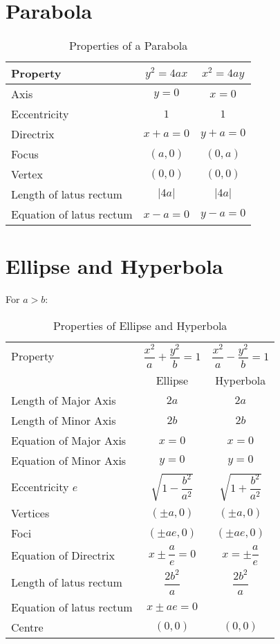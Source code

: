 \documentclass[openany, oneside]{book}
\begin{document}
\section{Parabola}
\begin{table}[H]
\caption{Properties of a Parabola}
\label{parabola}
\begin{center}
\begin{tabular}{l|c|c}
Property&$y^2=4ax$&$x^2=4ay$\\
\hline
Axis&$y=0$&$x=0$\\
Eccentricity&$1$&$1$\\
Directrix&$x+a=0$&$y+a=0$\\
Focus&$(a,0)$&$(0,a)$\\
Vertex&$(0,0)$&$(0,0)$\\
Length of latus rectum&$\lvert 4a \rvert$&$\lvert 4a \rvert$\\
Equation of latus rectum&$x-a=0$&$y-a=0$\\
\end{tabular}
\end{center}
\end{table}

\section{Ellipse and Hyperbola}
For $a>b$:
\begin{table}[H]
\begin{center}
\caption{Properties of Ellipse and Hyperbola}
\label{ell&hyp}
\begin{tabular}{l|c|c}
Property&$\dfrac{x^2}{a}+\dfrac{y^2}{b}=1$&$\dfrac{x^2}{a}-\dfrac{y^2}{b}=1$\\
&Ellipse&Hyperbola\\
\hline
Length of Major Axis&$2a$&$2a$\\
Length of Minor Axis&$2b$&$2b$\\
Equation of Major Axis&$x=0$&$x=0$\\
Equation of Minor Axis&$y=0$&$y=0$\\
Eccentricity $e$&$\sqrt{1-\dfrac{b^2}{a^2}}$&$\sqrt{1+\dfrac{b^2}{a^2}}$\\
Vertices&$(\pm a,0)$&$(\pm a,0)$\\
Foci&$(\pm ae,0)$&$(\pm ae,0)$\\
Equation of Directrix&$x \pm \dfrac{a}{e}=0$ &$x=\pm\dfrac{a}{e}$\\
Length of latus rectum&$\dfrac{2b^2}{a}$&$\dfrac{2b^2}{a}$\\
Equation of latus rectum&$x \pm ae=0$& \\
Centre&$(0,0)$&$(0,0)$
\end{tabular}
\end{center}
\end{table}
\end{document}
